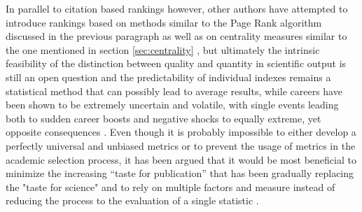  In parallel to citation based rankings however, other authors have attempted to introduce rankings based on methods similar to the Page Rank algorithm discussed in the previous paragraph \cite{PhysRevE.80.056103,Yan2010}
as well as on centrality measures similar to the one mentioned in section \ref{sec:centrality} \cite{Yan2009}, but ultimately the intrinsic feasibility of the distinction
between quality and quantity in scientific output is still an open question \cite{Kaur2015} and the predictability of individual indexes remains a statistical method that can possibly
lead to average results, while careers have been shown to be extremely uncertain and volatile, with single events leading both to sudden career boosts \cite{10.1371/journal.pone.0018975} and negative shocks
to equally extreme, yet opposite consequences \cite{Petersen2012}. Even though it is probably impossible to either develop a perfectly universal and unbiased metrics or to
prevent the usage of metrics in the academic selection process, it has been argued that it would be most beneficial to minimize the increasing ``taste for publication'' \cite{Osterloh2010}
that has been gradually replacing the "taste for science" and to rely on multiple factors and measure instead of reducing the process to the evaluation of a 
single statistic \cite{Frey2010}.
